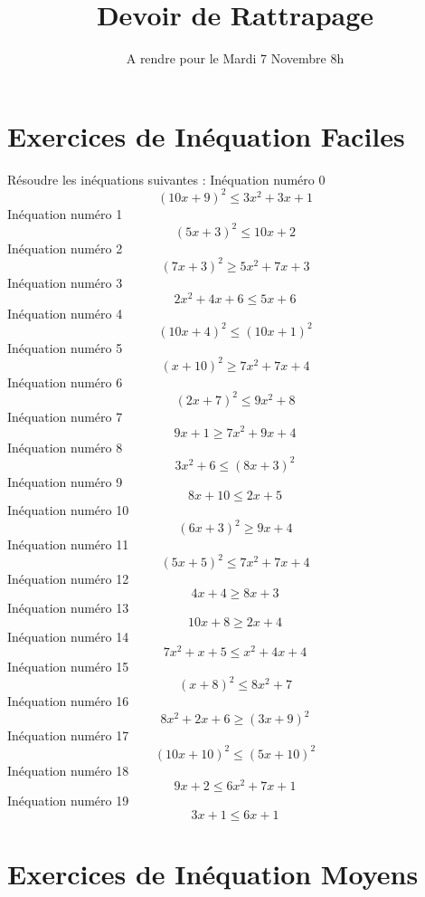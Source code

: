 \documentclass{article}
\title{Devoir de Rattrapage}
\date{A rendre pour le Mardi 7 Novembre 8h}\usepackage{natbib}
\begin{document}
\maketitle
 \section{Exercices de In\'equation Faciles}

 R\'esoudre les in\'equations suivantes : 
In\'equation num\'ero 0 \[\left(10 x + 9\right)^{2} \leq 3 x^{2} + 3 x + 1\]In\'equation num\'ero 1 \[\left(5 x + 3\right)^{2} \leq 10 x + 2\]In\'equation num\'ero 2 \[\left(7 x + 3\right)^{2} \geq 5 x^{2} + 7 x + 3\]In\'equation num\'ero 3 \[2 x^{2} + 4 x + 6 \leq 5 x + 6\]In\'equation num\'ero 4 \[\left(10 x + 4\right)^{2} \leq \left(10 x + 1\right)^{2}\]In\'equation num\'ero 5 \[\left(x + 10\right)^{2} \geq 7 x^{2} + 7 x + 4\]In\'equation num\'ero 6 \[\left(2 x + 7\right)^{2} \leq 9 x^{2} + 8\]In\'equation num\'ero 7 \[9 x + 1 \geq 7 x^{2} + 9 x + 4\]In\'equation num\'ero 8 \[3 x^{2} + 6 \leq \left(8 x + 3\right)^{2}\]In\'equation num\'ero 9 \[8 x + 10 \leq 2 x + 5\]In\'equation num\'ero 10 \[\left(6 x + 3\right)^{2} \geq 9 x + 4\]In\'equation num\'ero 11 \[\left(5 x + 5\right)^{2} \leq 7 x^{2} + 7 x + 4\]In\'equation num\'ero 12 \[4 x + 4 \geq 8 x + 3\]In\'equation num\'ero 13 \[10 x + 8 \geq 2 x + 4\]In\'equation num\'ero 14 \[7 x^{2} + x + 5 \leq x^{2} + 4 x + 4\]In\'equation num\'ero 15 \[\left(x + 8\right)^{2} \leq 8 x^{2} + 7\]In\'equation num\'ero 16 \[8 x^{2} + 2 x + 6 \geq \left(3 x + 9\right)^{2}\]In\'equation num\'ero 17 \[\left(10 x + 10\right)^{2} \leq \left(5 x + 10\right)^{2}\]In\'equation num\'ero 18 \[9 x + 2 \leq 6 x^{2} + 7 x + 1\]In\'equation num\'ero 19 \[3 x + 1 \leq 6 x + 1\]
 \section{Exercices de In\'equation Moyens}
\end{document}
